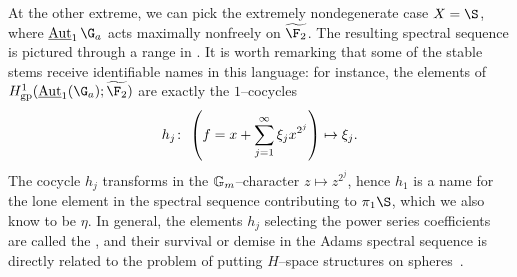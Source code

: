 \begin{example}\label{HopfInvariant1ExampleMO}
At the other extreme, we can pick the extremely nondegenerate case \(X = \S\), where \(\InternalAut_1 \G_a\) acts maximally nonfreely on \(\widetilde{\F_2}\).  The resulting spectral sequence is pictured through a range in .  It is worth remarking that some of the stable stems receive identifiable names in this language: for instance, the elements of \(H^1_{\mathrm{gp}}(\InternalAut_1(\G_a); \widetilde{\F_2})\) are exactly the \(1\)--cocycles \[h_j\colon\thinspace \left( f = x + \sum_{j=1}^\infty \xi_j x^{2^j}\right) \mapsto \xi_j.\]  The cocycle \(h_j\) transforms in the \(\mathbb G_m\)--character \(z \mapsto z^{2^j}\), hence \(h_1\) is a name for the lone element in the spectral sequence contributing to \(\pi_1 \S\), which we also know to be \(\eta\).  In general, the elements \(h_j\) selecting the power series coefficients are called the , and their survival or demise in the Adams spectral sequence is directly related to the problem of putting \(H\)--space structures on spheres~\cite{AdamsVFoS}.
\end{example}













